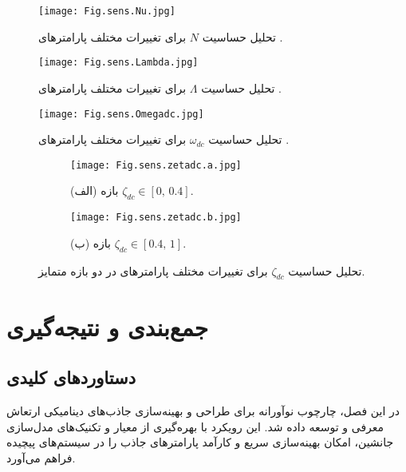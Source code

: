 \begin{figure}[htbp]
  \centering
  \texttt{[image: Fig.sens.Nu.jpg]}
  \caption{تحلیل حساسیت $N$ برای تغییرات مختلف پارامترهای .}
  \label{fig:N_sens}
\end{figure}

\begin{figure}[htbp]
  \centering
  \texttt{[image: Fig.sens.Lambda.jpg]}
  \caption{تحلیل حساسیت $\Lambda$ برای تغییرات مختلف پارامترهای .}
  \label{fig:Lambda_sens}
\end{figure}

\begin{figure}[htbp]
  \centering
  \texttt{[image: Fig.sens.Omegadc.jpg]}
  \caption{تحلیل حساسیت $\omega_{dc}$ برای تغییرات مختلف پارامترهای .}
  \label{fig:omega_dc_sens}
\end{figure}

\begin{figure}[htbp]
  \centering
  \begin{subfigure}[t]{\linewidth}
    \centering
    \texttt{[image: Fig.sens.zetadc.a.jpg]}
    \caption{(الف) بازه $\zeta_{dc}\in[0,\,0.4]$.}
    \label{subfig:zeta_dc_a}
  \end{subfigure}\vfill
  \begin{subfigure}[t]{\linewidth}
    \centering
    \texttt{[image: Fig.sens.zetadc.b.jpg]}
    \caption{(ب) بازه $\zeta_{dc}\in[0.4,\,1]$.}
    \label{subfig:zeta_dc_b}
  \end{subfigure}
  \caption{تحلیل حساسیت $\zeta_{dc}$ برای تغییرات مختلف پارامترهای  در دو بازه متمایز.}
  \label{fig:zeta_ranges}
\end{figure}

\section{جمع‌بندی و نتیجه‌گیری}

\subsection{دستاوردهای کلیدی}

در این فصل، چارچوب نوآورانه  برای طراحی و بهینه‌سازی جاذب‌های دینامیکی ارتعاش معرفی و توسعه داده شد. این رویکرد با بهره‌گیری از معیار  و تکنیک‌های مدل‌سازی جانشین، امکان بهینه‌سازی سریع و کارآمد پارامترهای جاذب را در سیستم‌های پیچیده فراهم می‌آورد.

